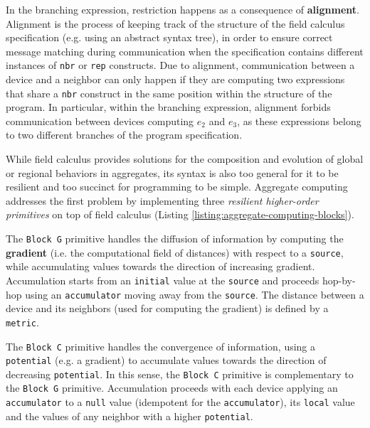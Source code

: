 \begin{itemize}
        In the branching expression, restriction happens as a consequence of
        \textbf{alignment}. Alignment is the process of keeping track of the
        structure of the field calculus specification (e.g. using an abstract
        syntax tree), in order to ensure correct message matching during
        communication when the specification contains different instances of
        \texttt{nbr} or \texttt{rep} constructs. Due to alignment,
        communication between a device and a neighbor can only happen if they
        are computing two expressions that share a \texttt{nbr} construct in
        the same position within the structure of the program. In particular,
        within the branching expression, alignment forbids communication
        between devices computing $e_2$ and $e_3$, as these expressions belong
        to two different branches of the program specification.
\end{itemize}

While field calculus provides solutions for the composition and evolution of
global or regional behaviors in aggregates, its syntax is also too general for
it to be resilient and too succinct for programming to be simple. Aggregate
computing addresses the first problem by implementing three \textit{resilient
higher-order primitives} on top of field calculus (Listing
\ref{listing:aggregate-computing-blocks}).



The \texttt{Block G} primitive \cite{CAS-AggregateComputingBlocks} handles the
diffusion of information by computing the \textbf{gradient} (i.e. the
computational field of distances) with respect to a \texttt{source}, while
accumulating values towards the direction of increasing gradient. Accumulation
starts from an \texttt{initial} value at the \texttt{source} and proceeds
hop-by-hop using an \texttt{accumulator} moving away from the \texttt{source}.
The distance between a device and its neighbors (used for computing the
gradient) is defined by a \texttt{metric}.

The \texttt{Block C} primitive handles the convergence of information, using a
\texttt{potent\-ial} (e.g. a gradient) to accumulate values towards the
direction of decreasing \texttt{potent\-ial}. In this sense, the \texttt{Block
C} primitive is complementary to the \texttt{Block G} primitive. Accumulation
proceeds with each device applying an \texttt{accumulator} to a \texttt{null}
value (idempotent for the \texttt{accumulator}), its \texttt{local} value and
the values of any neighbor with a higher \texttt{potential}.

